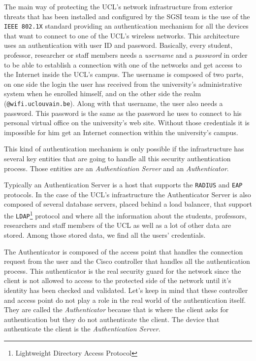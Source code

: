 The main way of protecting the UCL's network infrastructure from exterior threats that has been installed and configured by the SGSI team is the use of the \texttt{IEEE 802.1X} standard providing an authentication mechanism for all the devices that want to connect to one of the UCL's wireless networks. This architecture uses an authentication with user ID and password. Basically, every student, professor, researcher or staff members needs a \textit{username} and a \textit{password} in order to be able to establish a connection with one of the networks and get access to the Internet inside the UCL's campus. The username is composed of two parts, on one side the login the user has received from the university's administrative system when he enrolled himself, and on the other side the realm (\texttt{@wifi.uclouvain.be}). Along with that username, the user also needs a password. This password is the same as the password he uses to connect to his personal virtual office on the university's web site. Without those credentials it is impossible for him get an Internet connection within the university's campus.

This kind of authentication mechanism is only possible if the infrastructure has several key entities that are going to handle all this security authentication process. Those entities are an \textit{Authentication Server} and an \textit{Authenticator}.

Typically an Authentication Server is a host that supports the \texttt{RADIUS} and  \texttt{EAP} protocols. In the case of the UCL's infrastructure the Authenticator Server is also composed of several database servers, placed behind a load balancer, that support the \texttt{LDAP}\footnote{Lightweight Directory Access Protocol} protocol and where all the information about the students, professors, researchers and staff members of the UCL as well as a lot of other data are stored. Among those stored data, we find all the users' credentials.

The Authenticator is composed of the access point that handles the connection request from the user and the Cisco controller that handles all the authentication process. This authenticator is the real security guard for the network since the client is not allowed to access to the protected side of the network until it's identity has been checked and validated. Let's keep in mind that these controller and access point do not play a role in the real world of the authentication itself. They are called the \textit{Authenticator} because that is where the client asks for authentication but they do not authenticate the client. The device that authenticate the client is the \textit{Authentication Server}.


